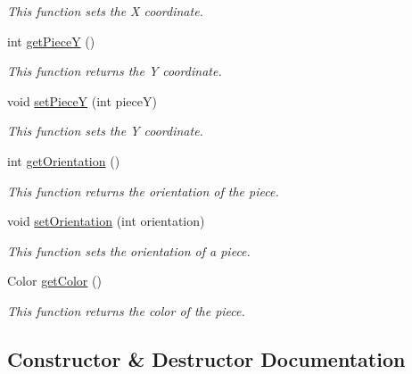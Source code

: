 \begin{DoxyCompactItemize}
\begin{DoxyCompactList}\small\item\em This function sets the X coordinate. \end{DoxyCompactList}\item 
int \hyperlink{class_project_tetris_1_1_group11_1_1_model_1_1_piece_a4c4c4dacf31d9824f2a223a722833b55}{get\+PieceY} ()
\begin{DoxyCompactList}\small\item\em This function returns the Y coordinate. \end{DoxyCompactList}\item 
void \hyperlink{class_project_tetris_1_1_group11_1_1_model_1_1_piece_a95bc4289b926d0dbc31cffee2089d464}{set\+PieceY} (int pieceY)
\begin{DoxyCompactList}\small\item\em This function sets the Y coordinate. \end{DoxyCompactList}\item 
int \hyperlink{class_project_tetris_1_1_group11_1_1_model_1_1_piece_aaad692840f784a0a1fd016a64830240e}{get\+Orientation} ()
\begin{DoxyCompactList}\small\item\em This function returns the orientation of the piece. \end{DoxyCompactList}\item 
void \hyperlink{class_project_tetris_1_1_group11_1_1_model_1_1_piece_a84cf70c609e13d3a31f7c3815ddff827}{set\+Orientation} (int orientation)
\begin{DoxyCompactList}\small\item\em This function sets the orientation of a piece. \end{DoxyCompactList}\item 
Color \hyperlink{class_project_tetris_1_1_group11_1_1_model_1_1_piece_a0e992758414c2d119d0501d6a7d2cd0f}{get\+Color} ()
\begin{DoxyCompactList}\small\item\em This function returns the color of the piece. \end{DoxyCompactList}\end{DoxyCompactItemize}


\subsection{Constructor \& Destructor Documentation}
\hypertarget{class_project_tetris_1_1_group11_1_1_model_1_1_piece_addee3c9cfed3f3a362cad4e89beaa27c}{}\label{class_project_tetris_1_1_group11_1_1_model_1_1_piece_addee3c9cfed3f3a362cad4e89beaa27c} 
